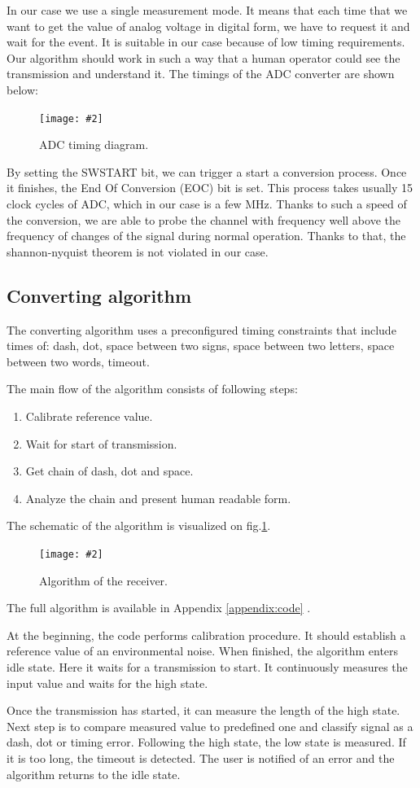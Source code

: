 \documentclass[12pt]{article}
\newcommand{\appendixCodeRef}
{
Appendix \ref{appendix:code}
}
\newcommand{\image}[3]{
\begin{figure}[h]
	\begin{center}
		\texttt{[image: \#2]}
	\end{center}
  \caption{#1}
\end{figure}}
\newcommand{\imageLabeled}[4]{
\begin{figure}[h]
	\begin{center}
		\texttt{[image: \#2]}
	\end{center}
  \caption{#1}
  \label{fig:#4}
\end{figure}}
\begin{document}
  In our case we use a single measurement mode. It means that each time that we want to get the value of analog voltage in digital form, we have to request it and wait for the event.
  It is suitable in our case because of low timing requirements. Our algorithm should work in such a way that a human operator could see the transmission and understand it.
  The timings of the ADC converter are shown below:
  
  \image{ADC timing diagram.}{adc_internals.png}{0.4}
  By setting the SWSTART bit, we can trigger a start a conversion process. Once it finishes, the End Of Conversion (EOC) bit is set.
  This process takes usually 15 clock cycles of ADC, which in our case is a few MHz.
  Thanks to such a speed of the conversion, we are able to probe the channel with frequency well above the frequency of changes of the signal during normal
  operation. Thanks to that, the shannon-nyquist theorem is not violated in our case.

  \subsection{Converting algorithm}
  The converting algorithm uses a preconfigured timing constraints that include times of: dash, dot, space between two signs, space between two letters, space between two words, timeout.
  \vspace{10pt}

  The main flow of the algorithm consists of following steps:
  \begin{enumerate}
    \item Calibrate reference value.
    \item Wait for start of transmission.
    \item Get chain of dash, dot and space.
    \item Analyze the chain and present human readable form.
  \end{enumerate}
  The schematic of the algorithm is visualized on fig.\ref{fig:algo}.
  \imageLabeled{Algorithm of the receiver.}{algorithm_receiver.png}{0.35}{algo}
  The full algorithm is available in \appendixCodeRef.

  At the beginning, the code performs calibration procedure. It should establish a reference value of an environmental noise.
  When finished, the algorithm enters idle state. Here it waits for a transmission to start. It continuously measures the input value and waits for the high state.

  Once the transmission has started, it can measure the length of the high state. Next step is to compare measured value to predefined one and classify signal as a dash, dot or timing error.
  Following the high state, the low state is measured. If it is too long, the timeout is detected. The user is notified of an error and the algorithm
  returns to the idle state.
\end{document}
